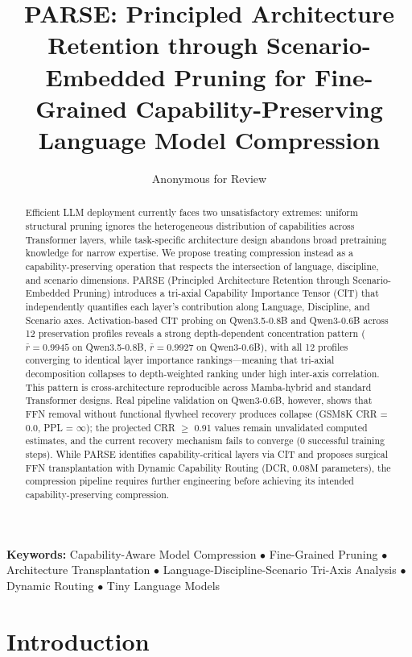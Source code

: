 \documentclass[twocolumn]{article}
\title{PARSE: Principled Architecture Retention through Scenario-Embedded Pruning for Fine-Grained Capability-Preserving Language Model Compression}
\author{Anonymous for Review}
\date{}
\begin{document}
\maketitle

\begin{abstract}
Efficient LLM deployment currently faces two unsatisfactory extremes: uniform structural pruning ignores the heterogeneous distribution of capabilities across Transformer layers, while task-specific architecture design abandons broad pretraining knowledge for narrow expertise. We propose treating compression instead as a capability-preserving operation that respects the intersection of language, discipline, and scenario dimensions. PARSE (Principled Architecture Retention through Scenario-Embedded Pruning) introduces a tri-axial Capability Importance Tensor (CIT) that independently quantifies each layer's contribution along Language, Discipline, and Scenario axes. Activation-based CIT probing on Qwen3.5-0.8B and Qwen3-0.6B across 12 preservation profiles reveals a strong depth-dependent concentration pattern ($\bar{r} = 0.9945$ on Qwen3.5-0.8B, $\bar{r} = 0.9927$ on Qwen3-0.6B), with all 12 profiles converging to identical layer importance rankings---meaning that tri-axial decomposition collapses to depth-weighted ranking under high inter-axis correlation. This pattern is cross-architecture reproducible across Mamba-hybrid and standard Transformer designs. Real pipeline validation on Qwen3-0.6B, however, shows that FFN removal without functional flywheel recovery produces collapse (GSM8K CRR = 0.0, PPL = $\infty$); the projected CRR $\geq$ 0.91 values remain unvalidated computed estimates, and the current recovery mechanism fails to converge (0 successful training steps). While PARSE identifies capability-critical layers via CIT and proposes surgical FFN transplantation with Dynamic Capability Routing (DCR, 0.08M parameters), the compression pipeline requires further engineering before achieving its intended capability-preserving compression.
\end{abstract}

\textbf{Keywords:} Capability-Aware Model Compression $\bullet$ Fine-Grained Pruning $\bullet$ Architecture Transplantation $\bullet$ Language-Discipline-Scenario Tri-Axis Analysis $\bullet$ Dynamic Routing $\bullet$ Tiny Language Models

\section{Introduction}
\end{document}
